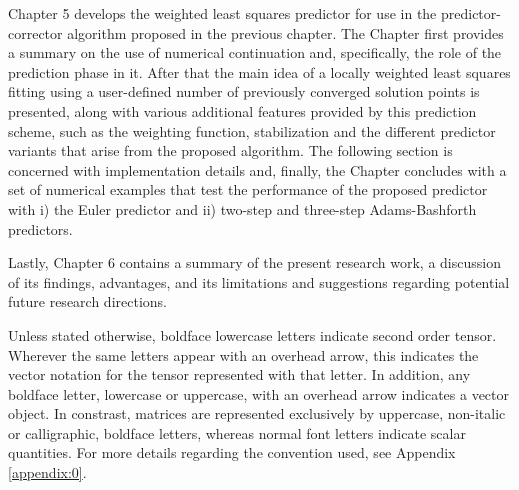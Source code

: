 Chapter 5 develops the weighted least squares predictor for use in the 
predictor-corrector algorithm proposed in the previous chapter. The Chapter first 
provides a summary on the use of numerical continuation and, specifically, the role of 
the prediction phase in it. After that the main idea of a locally weighted 
least squares 
fitting using a user-defined number of previously converged solution points is 
presented, along with various additional features provided by this prediction scheme, 
such as the weighting function, stabilization and the different predictor variants 
that arise from the proposed algorithm. The following section is concerned with 
implementation details and, finally, the Chapter concludes with a set of numerical 
examples that test the performance of the proposed predictor with i) the Euler 
predictor and ii) two-step and three-step Adams-Bashforth predictors. 

Lastly, Chapter 6 contains a summary of the present research work, a discussion of its 
findings, advantages, and its limitations and suggestions regarding potential 
future 
research directions.

 
Unless stated otherwise, boldface lowercase letters indicate second order 
tensor. Wherever 
the same letters appear with an overhead arrow, this indicates the vector 
notation for the tensor represented with that letter.
In addition, any boldface letter, lowercase or uppercase, with an overhead 
arrow indicates a vector object. In constrast, matrices are represented 
exclusively by uppercase, non-italic or calligraphic, boldface letters,
whereas normal font letters indicate scalar quantities.  For more details 
regarding the convention used, see Appendix \ref{appendix:0}.





